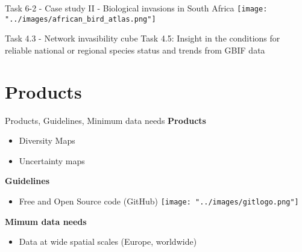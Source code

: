 \documentclass{beamer}
\begin{document}
\begin{frame}{Task 6-2 - Case study II - Biological invasions in South Africa}
\centering
\texttt{[image: "../images/african\_bird\_atlas.png"]}

\smallskip
\scriptsize{Task 4.3 - Network invasibility cube}
\scriptsize{Task 4.5: Insight in the conditions for reliable national or regional species status and trends from GBIF data}
\end{frame}


\section{Products}

\begin{frame}{Products, Guidelines, Minimum data needs}
\textbf{Products}
	\begin{itemize}
		\item Diversity Maps 
		\item Uncertainty maps 
	\end{itemize}
\textbf{Guidelines}
	\begin{itemize}
		\item Free and Open Source code (GitHub)  \texttt{[image: "../images/gitlogo.png"]}
	\end{itemize}
\textbf{Mimum data needs}
	\begin{itemize}
		\item Data at wide spatial scales (Europe, worldwide)
	\end{itemize}
\end{frame}
\end{document}
